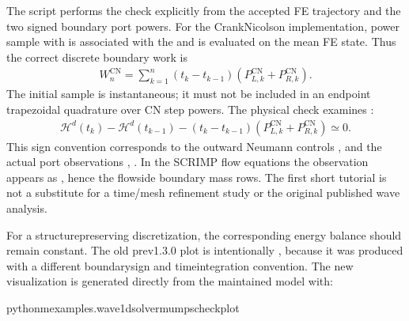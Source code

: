 \documentclass[letterpaper,10pt,english]{sphinxmanual}
\begin{document}
\sphinxAtStartPar
The script performs the check explicitly from the accepted FE
trajectory and the two signed boundary port powers. For the
Crank\textendash{}Nicolson implementation, power sample  with
 is associated with the 
and is evaluated on the mean FE state. Thus the correct discrete
boundary work is
\begin{equation*}
\begin{split}W_n^{\mathrm{CN}} =
\sum_{k=1}^{n}(t_k-t_{k-1})
\left(P_{L,k}^{\mathrm{CN}}+P_{R,k}^{\mathrm{CN}}\right).\end{split}
\end{equation*}
\sphinxAtStartPar
The initial sample  is instantaneous; it must not
be included in an endpoint trapezoidal quadrature over CN step
powers. The physical check examines :
\begin{equation*}
\begin{split}\mathcal{H}^d(t_k)-\mathcal{H}^d(t_{k-1})
-(t_k-t_{k-1})\left(P_{L,k}^{\mathrm{CN}}+
P_{R,k}^{\mathrm{CN}}\right)\simeq 0.\end{split}
\end{equation*}
\sphinxAtStartPar
This sign convention corresponds to the outward Neumann controls
,  and the actual port
observations , .
In the SCRIMP flow equations the observation appears as ,
hence the  flow\sphinxhyphen{}side boundary mass rows.
The first short tutorial is not a substitute for a time/mesh
refinement study or the original published wave analysis.

\sphinxAtStartPar
For a structure\sphinxhyphen{}preserving discretization, the corresponding
energy balance should remain constant. The old pre\sphinxhyphen{}v1.3.0 plot is
intentionally , because it was produced
with a different boundary\sphinxhyphen{}sign and time\sphinxhyphen{}integration convention.
The new visualization is generated directly from the maintained
model with:

\begin{sphinxVerbatim}[commandchars=\\\{\}]
python\PYGZhy{}mexamples.wave\PYGZus{}1d\PYGZhy{}\PYGZhy{}solvermumps\PYGZhy{}\PYGZhy{}check\PYGZhy{}\PYGZhy{}plot
\end{sphinxVerbatim}
\end{document}
